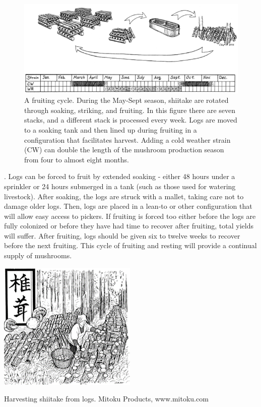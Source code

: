 \documentclass{tufte-handout}
\begin{document}
\begin{figure}
\includegraphics{fruiting}
\caption{A fruiting cycle. During the May-Sept season, shiitake are rotated through soaking, striking, and fruiting. 
In this figure there are seven stacks, and a different stack is processed every week. Logs are moved to a soaking tank and then lined up during fruiting in a configuration that facilitates harvest.
Adding a cold weather strain (CW) can double the length of the mushroom production season from four to almost eight months.}
\end{figure}

. 
Logs can be forced to fruit by extended soaking - either 48 hours under a sprinkler or 24 hours submerged in a tank (such as those used for watering livestock). 
After soaking, the logs are struck with a mallet,  taking care not to damage older logs. 
Then, logs are placed in a lean-to or other configuration that will allow easy access to pickers.
If fruiting is forced too either before the logs are fully colonized or before they have had time to recover after fruiting, total yields will suffer. 
After fruiting, logs should be given six to twelve weeks to recover before the next fruiting. 
This cycle of fruiting and resting will provide a continual supply of mushrooms.

\begin{marginfigure}
\includegraphics{shiitake-harvest}
\caption{Harvesting shiitake from logs. Mitoku Products, www.mitoku.com}
\end{marginfigure}
\end{document}
